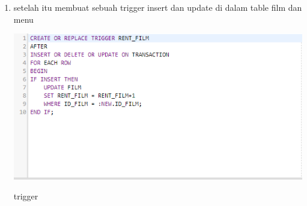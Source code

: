 \documentclass{article}
\begin{document}
\begin{enumerate}
    \item setelah itu membuat sebuah trigger insert dan update di dalam table film dan menu
    \begin{center}
         \centering
            \includegraphics[scale=0.27]{figures/9.PNG}
        \caption{trigger }
        \label{create}
    \end{center}
      
    
\end{enumerate}
\end{document}
